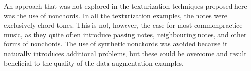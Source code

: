 
An approach that was not explored in the texturization
techniques proposed here was the use of \gls{nonchord}s. In
all the texturization examples, the notes were exclusively
chord tones. This is not, however, the case for most
\gls{commonpractice} music, as they quite often introduce
passing notes, neighbouring notes, and other forms of
\gls{nonchord}s. The use of synthetic \gls{nonchord}s was
avoided because it naturally introduces additional problems,
but these could be overcome and result beneficial to the
quality of the data-augmentation examples.
